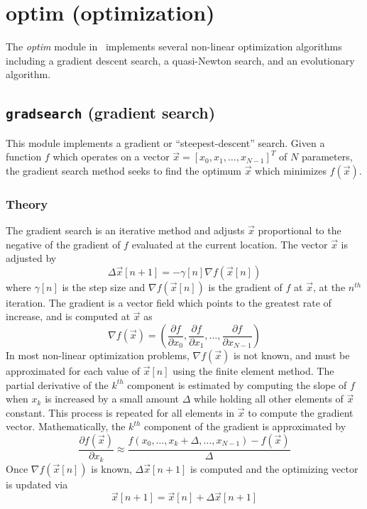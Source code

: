 % 
%

\newpage
\section{optim (optimization)}
\label{module:optim}
The {\em optim} module in \liquid\ implements several non-linear
optimization algorithms including
a gradient descent search,
a quasi-Newton search,
and an evolutionary algorithm.

\subsection{{\tt gradsearch} (gradient search)}
\label{module:optim:gradsearch}
This module implements a gradient or ``steepest-descent'' search.
Given a function $f$ which operates on a vector
$\vec{x} = [x_0,x_1,\ldots,x_{N-1}]^T$ of $N$ parameters,
the gradient search method seeks to find the optimum $\vec{x}$ which
minimizes $f(\vec{x})$.

\subsubsection{Theory}
The gradient search is an iterative method and adjusts $\vec{x}$ proportional
to the negative of the gradient of $f$ evaluated at the current location.
The vector $\vec{x}$ is adjusted by
\[
    \Delta \vec{x}[n+1] = -\gamma[n] \nabla f(\vec{x}[n])
\]
where $\gamma[n]$ is the step size and
$\nabla f(\vec{x}[n])$ is the gradient of $f$ at $\vec{x}$, at the $n^{th}$
iteration.
The gradient is a vector field which points to the greatest rate of increase,
and is computed at $\vec{x}$ as
\[
    \nabla f(\vec{x}) = \left(
        \frac{\partial f}{\partial x_0},
        \frac{\partial f}{\partial x_1},
        \ldots,
        \frac{\partial f}{\partial x_{N-1}}
    \right)
\]
In most non-linear optimization problems, $\nabla f(\vec{x})$ is not known,
and must be approximated for each value of $\vec{x}[n]$ using the finite element
method.
The partial derivative of the $k^{th}$ component is estimated by computing the
slope of $f$ when $x_k$ is increased by a small amount $\Delta$ while holding
all other elements of $\vec{x}$ constant.
This process is repeated for all elements in $\vec{x}$ to compute the gradient
vector.
Mathematically, the $k^{th}$ component of the gradient is approximated by
\[
    \frac{\partial f(\vec{x})}{\partial x_k} \approx 
    \frac{f(x_0,\ldots,x_k+\Delta,\ldots,x_{N-1}) - f(\vec{x})}{\Delta}
\]
Once $\nabla f(\vec{x}[n])$ is known, $\Delta\vec{x}[n+1]$ is computed and the
optimizing vector is updated via
\[
    \vec{x}[n+1] = \vec{x}[n] + \Delta\vec{x}[n+1]
\]

